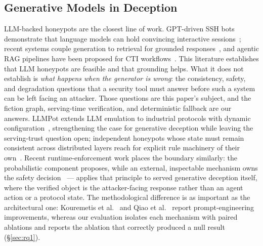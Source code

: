 \subsection{Generative Models in Deception}
LLM-backed honeypots are the closest line of work. GPT-driven SSH bots
demonstrate that language models can hold convincing interactive
sessions~\cite{valeros2024}; recent systems couple generation to
retrieval for grounded responses~\cite{qiao2025,liang2025}, and agentic
RAG pipelines have been proposed for
CTI workflows~\cite{belmahjoub2025,gao2025}. This literature establishes
that LLM honeypots are feasible and that grounding helps. What it does not
establish is \emph{what happens when the generator is wrong}: the
consistency, safety, and degradation questions that a security tool must
answer before such a system can be left facing an attacker. Those
questions are this paper's subject, and the fiction graph, serving-time
verification, and deterministic fallback are our answers. LLMPot
extends LLM emulation to industrial protocols with dynamic
configuration~\cite{vasilatos2025llmpot}, strengthening the case for
generative deception while leaving the serving-trust question open;
independent honeypots whose state must remain consistent across
distributed layers reach for explicit rule machinery of their
own~\cite{guan2025cpds}. Recent runtime-enforcement work places the
boundary similarly: the probabilistic component proposes, while an
external, inspectable mechanism owns the safety
decision~\cite{wang2026agentspec} --- \system applies that principle to
served generative deception itself, where the verified object is the
attacker-facing response rather than an agent action or a
protocol state. The
methodological difference is as important as the architectural one:
Kouremetis et al.~\cite{kouremetis2024} and Qiao et al.~\cite{qiao2025}
report prompt-engineering improvements, whereas
our evaluation isolates each mechanism with paired ablations and reports
the ablation that correctly produced a null result (\S\ref{sec:rq1}).

